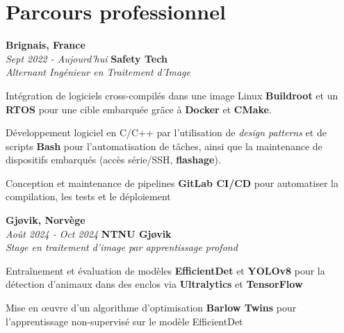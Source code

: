 
    \section{Parcours professionnel}
        \begin{twocolentry}{
			\textbf{Brignais, France} \\
			\textit{Sept 2022 - Aujourd'hui}
            }{
            \textbf{Safety Tech} \\
            \textit{Alternant Ingénieur en Traitement d'Image}
            }
        \end{twocolentry}

        \begin{onecolentry}
            \begin{highlights}
                \item Intégration de logiciels cross-compilés dans une image Linux \textbf{Buildroot} et un \textbf{RTOS} pour une cible embarquée grâce à \textbf{Docker} et \textbf{CMake}.
                \item Développement logiciel en C/C++ par l'utilisation de \textit{design patterns} et de scripts \textbf{Bash} pour l'automatisation de tâches, ainsi que la maintenance de dispositifs embarqués (accès série/SSH, \textbf{flashage}).
                \item Conception et maintenance de pipelines \textbf{GitLab CI/CD} pour automatiser la compilation, les tests et le déploiement
            \end{highlights}
        \end{onecolentry}

        \begin{twocolentry}{
			\textbf{Gjøvik, Norvège} \\
			\textit{Août 2024 - Oct 2024}
            }{
			\textbf{NTNU Gjøvik} \\
			\textit{Stage en traitement d'image par apprentissage profond}
            }
        \end{twocolentry}

        \begin{onecolentry}
            \begin{highlights}
                \item Entraînement et évaluation de modèles \textbf{EfficientDet} et \textbf{YOLOv8} pour la détection d'animaux dans des enclos via \textbf{Ultralytics} et \textbf{TensorFlow}
                \item Mise en œuvre d'un algorithme d'optimisation \textbf{Barlow Twins} pour l'apprentissage non-supervisé sur le modèle EfficientDet
            \end{highlights}
        \end{onecolentry}

